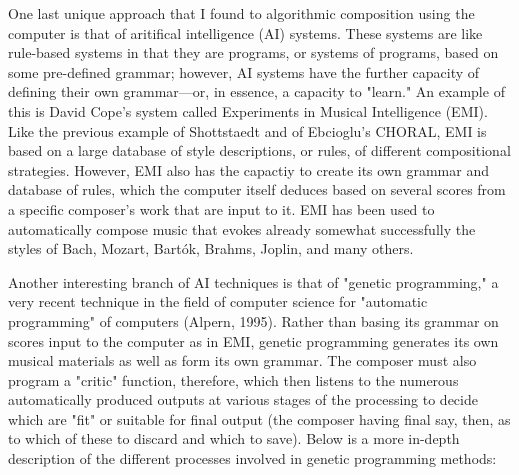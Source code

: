 \documentclass{automatextcc}
\begin{document}
One last unique approach that I found to algorithmic composition using the computer is that of aritifical intelligence (AI) systems. These systems are like rule-based systems in that they are programs, or systems of programs, based on some pre-defined grammar; however, AI systems have the further capacity of defining their own grammar—or, in essence, a capacity to "learn." An example of this is David Cope's system called Experiments in Musical Intelligence (EMI). Like the previous example of Shottstaedt and of Ebcioglu's CHORAL, EMI is based on a large database of style descriptions, or rules, of different compositional strategies. However, EMI also has the capactiy to create its own grammar and database of rules, which the computer itself deduces based on several scores from a specific composer's work that are input to it. EMI has been used to automatically compose music that evokes already somewhat successfully the styles of Bach, Mozart, Bartók, Brahms, Joplin, and many others.

Another interesting branch of AI techniques is that of "genetic programming," a very recent technique in the field of computer science for "automatic programming" of computers (Alpern, 1995). Rather than basing its grammar on scores input to the computer as in EMI, genetic programming generates its own musical materials as well as form its own grammar. The composer must also program a "critic" function, therefore, which then listens to the numerous automatically produced outputs at various stages of the processing to decide which are "fit" or suitable for final output (the composer having final say, then, as to which of these to discard and which to save). Below is a more in-depth description of the different processes involved in genetic programming methods:
\end{document}
